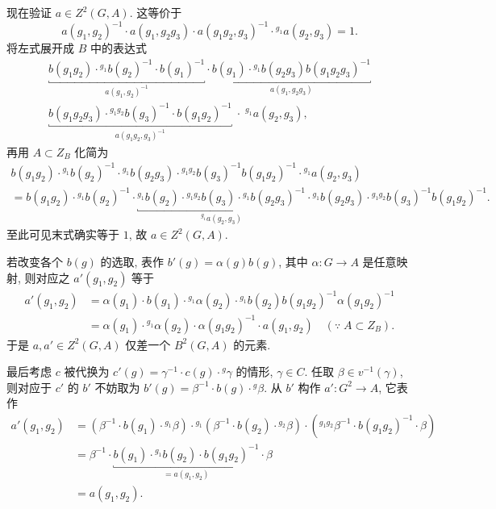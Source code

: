 现在验证 $a \in Z^2(G, A)$. 这等价于
\[ a(g_1, g_2)^{-1} \cdot a(g_1, g_2 g_3) \cdot a(g_1 g_2, g_3)^{-1} \cdot {}^{g_1} a(g_2, g_3) = 1. \]
将左式展开成 $B$ 中的表达式
\begin{multline*}
	\underbracket{b(g_1 g_2) \cdot {}^{g_1} b(g_2)^{-1} \cdot b(g_1)^{-1}}_{a(g_1, g_2)^{-1}} \cdot \underbracket{b(g_1) \cdot {}^{g_1} b(g_2 g_3) b(g_1 g_2 g_3)^{-1}}_{a(g_1, g_2 g_3)} \\
	\underbracket{b(g_1 g_2 g_3) \cdot {}^{g_1 g_2} b(g_3)^{-1} \cdot b(g_1 g_2)^{-1}}_{a(g_1 g_2, g_3)^{-1}} \; \cdot \; {}^{g_1} a(g_2, g_3),
\end{multline*}
再用 $A \subset Z_B$ 化简为
\begin{multline*}
	b(g_1 g_2) \cdot {}^{g_1} b(g_2)^{-1} \cdot {}^{g_1} b(g_2 g_3) \cdot {}^{g_1 g_2} b(g_3)^{-1}  b(g_1 g_2)^{-1} \cdot {}^{g_1} a(g_2, g_3) \\
	= b(g_1 g_2) \cdot {}^{g_1} b(g_2)^{-1} \cdot \underbracket{{}^{g_1} b(g_2) \cdot {}^{g_1 g_2} b(g_3) \cdot {}^{g_1} b(g_2 g_3)^{-1}}_{{}^{g_1} a(g_2, g_3)} \cdot {}^{g_1} b(g_2 g_3) \cdot {}^{g_1 g_2} b(g_3)^{-1}  b(g_1 g_2)^{-1} .
\end{multline*}
至此可见末式确实等于 $1$, 故 $a \in Z^2(G, A)$.

若改变各个 $b(g)$ 的选取, 表作 $b'(g) = \alpha(g) b(g)$, 其中 $\alpha: G \to A$ 是任意映射, 则对应之 $a'(g_1, g_2)$ 等于
\begin{align*}
	a'(g_1, g_2) & = \alpha(g_1) \cdot b(g_1) \cdot {}^{g_1} \alpha(g_2) \cdot {}^{g_1} b(g_2) b(g_1 g_2)^{-1} \alpha(g_1 g_2)^{-1} \\
	& = \alpha(g_1) \cdot {}^{g_1} \alpha(g_2) \cdot \alpha(g_1 g_2)^{-1} \cdot a(g_1, g_2) \quad (\because\; A \subset Z_B).
\end{align*}
于是 $a, a' \in Z^2(G, A)$ 仅差一个 $B^2(G, A)$ 的元素.

最后考虑 $c$ 被代换为 $c'(g) = \gamma^{-1} \cdot c(g) \cdot {}^g \gamma$ 的情形, $\gamma \in C$. 任取 $\beta \in v^{-1}(\gamma)$, 则对应于 $c'$ 的 $b'$ 不妨取为 $b'(g) = \beta^{-1} \cdot b(g) \cdot {}^g \beta$. 从 $b'$ 构作 $a': G^2 \to A$, 它表作
\begin{align*}
	a'(g_1, g_2) & = \left( \beta^{-1} \cdot b(g_1) \cdot {}^{g_1} \beta \right) \cdot {}^{g_1} \left( \beta^{-1} \cdot b(g_2) \cdot {}^{g_2} \beta \right) \cdot \left( {}^{g_1 g_2} \beta^{-1} \cdot b(g_1 g_2)^{-1} \cdot \beta \right) \\
	& = \beta^{-1} \cdot \underbracket{b(g_1) \cdot {}^{g_1} b(g_2) \cdot b(g_1 g_2)^{-1}}_{= a(g_1, g_2)} \cdot \beta \\
	& = a(g_1, g_2).
\end{align*}

